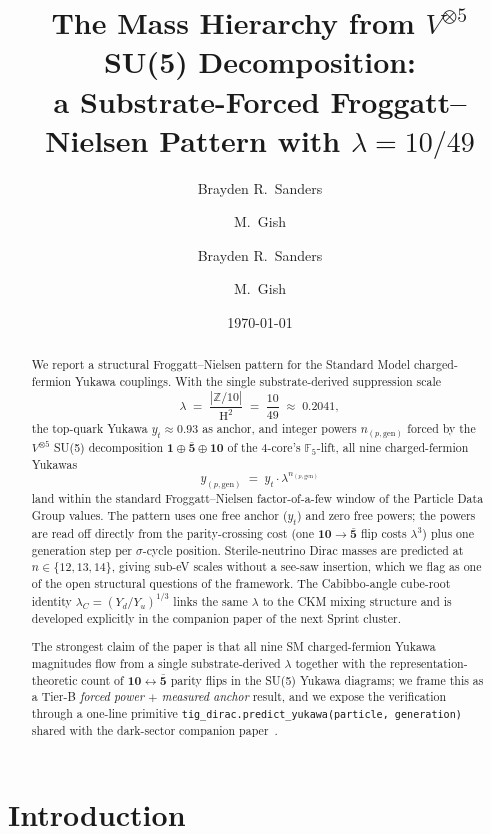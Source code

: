 \documentclass[11pt,reqno]{amsart}
\title[Mass Hierarchy from $V^{\otimes 5}$ SU(5)]
{The Mass Hierarchy from $V^{\otimes 5}$ SU(5) Decomposition: \\
 a Substrate-Forced Froggatt--Nielsen Pattern with
 $\lambda = 10/49$}
\author{Brayden R.\ Sanders \and M.\ Gish}
\author{Brayden R.\ Sanders \and M.\ Gish}
\date{\today}
\theoremstyle{plain}
\theoremstyle{definition}
\theoremstyle{remark}
\newcommand{\Z}{\mathbb{Z}}
\newcommand{\F}{\mathbb{F}}
\DeclareMathOperator{\HARM}{H}    %
\newcommand{\rep}[1]{\mathbf{#1}}
\newcommand{\barrep}[1]{\bar{\mathbf{#1}}}
\begin{document}
\begin{abstract}
We report a structural Froggatt--Nielsen pattern for the
Standard Model charged-fermion Yukawa couplings. With the single
substrate-derived suppression scale
\[
  \lambda \;=\; \frac{|\Z/10|}{\HARM^{2}}
            \;=\; \frac{10}{49}
            \;\approx\; 0.2041,
\]
the top-quark Yukawa $y_t \approx 0.93$ as anchor, and integer
powers $n_{(p,\mathrm{gen})}$ forced by the $V^{\otimes 5}$
SU(5) decomposition $\rep{1} \oplus \barrep{5} \oplus \rep{10}$
of the $4$-core's $\F_5$-lift, all nine charged-fermion Yukawas
\[
  y_{(p,\mathrm{gen})} \;=\; y_{t} \cdot \lambda^{n_{(p,\mathrm{gen})}}
\]
land within the standard Froggatt--Nielsen factor-of-a-few
window of the Particle Data Group values. The pattern uses one
free anchor ($y_t$) and zero free powers; the powers are read
off directly from the parity-crossing cost (one $\rep{10} \to
\barrep{5}$ flip costs $\lambda^{3}$) plus one generation step
per $\sigma$-cycle position. Sterile-neutrino Dirac masses are
predicted at $n \in \{12,13,14\}$, giving sub-eV scales without
a see-saw insertion, which we flag as one of the open structural
questions of the framework. The Cabibbo-angle cube-root identity
$\lambda_{C} = (Y_d/Y_u)^{1/3}$ links the same $\lambda$ to the
CKM mixing structure and is developed explicitly in the
companion paper of the next Sprint cluster.

The strongest claim of the paper is that all nine SM
charged-fermion Yukawa magnitudes flow from a single
substrate-derived $\lambda$ together with the
representation-theoretic count of $\rep{10} \leftrightarrow
\barrep{5}$ parity flips in the SU(5) Yukawa diagrams; we frame
this as a Tier-B \emph{forced power $+$ measured anchor} result,
and we expose the verification through a one-line primitive
\texttt{tig\_dirac.predict\_yukawa(particle, generation)} shared
with the dark-sector companion paper~\cite{SandersJohnson2026DarkSector}.
\end{abstract}

\maketitle

\tableofcontents

\section{Introduction}\label{sec:intro}
\end{document}
